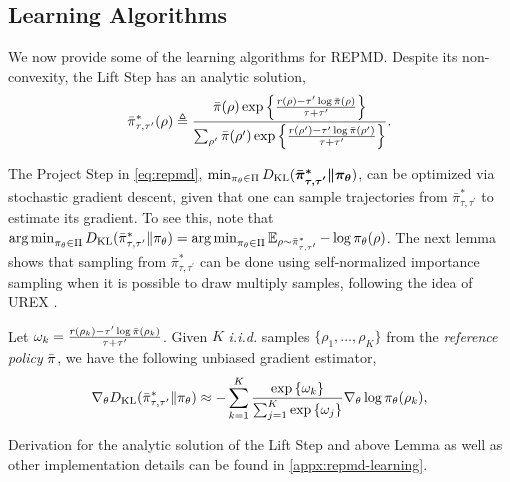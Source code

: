 \subsection{Learning Algorithms}

We now provide some of the learning algorithms for REPMD.
Despite its non-convexity, the Lift Step
has an analytic solution,
\begin{equation}
	\label{eq:pitautauprime}
	\bar{\pi}_{\tau,\tau^{\prime}}^*(\rho) \triangleq \frac{\bar{\pi}(\rho) \exp\left\{ \frac{r(\rho)-\tau^{\prime} \log \bar{\pi}(\rho) }{ \tau+\tau^{\prime}} \right\}}{ \sum_{\rho^{\prime}}{\bar{\pi}(\rho^{\prime}) \exp\left\{ \frac{r(\rho^{\prime})-\tau^{\prime} \log \bar{\pi}(\rho^{\prime})}{ \tau+\tau^{\prime}} \right\} } }.
\end{equation}
	
The Project Step in \cref{eq:repmd}, $\min\nolimits_{\pi_\theta \in \Pi}{D_{\mathrm{KL}}(\bm{ \bar{\pi}_{\tau,\tau^{\prime}}^* \| \pi_\theta }) }$, can be optimized via stochastic gradient descent, given that one can sample trajectories from $\bar{\pi}_{\tau,\tau^{\prime}}^*$ to estimate its gradient. To see this, note that $\operatorname*{arg\,min}\nolimits_{\pi_\theta \in \Pi}D_{\mathrm{KL}}(\bar{\pi}_{\tau,\tau^{\prime}}^* \| \pi_\theta) = \operatorname*{arg\,min}\nolimits_{\pi_\theta \in \Pi} \operatorname*{\mathbb{E}}_{\rho \sim \bar{\pi}_{\tau,\tau^{\prime}}^* }  - \log \pi_\theta(\rho)$. The next lemma shows that sampling from $\bar{\pi}_{\tau,\tau^{\prime}}^*$ can be done using self-normalized importance sampling \citep{owen2013monte} when it is possible to draw multiply samples, following the idea of UREX \citep{nachum2017improving}.   
\begin{lem}
\label{lem:repmdgradientestimate}
Let $\omega_k = \frac{r(\rho_k) - \tau^{\prime} \log{\bar{\pi}(\rho_k)} }{\tau + \tau^{\prime}}$. Given $K$ \emph{i.i.d.} samples $\{\rho_1, \dots, \rho_K\}$ from the \emph{reference policy} $\bar{\pi}$, we have the following unbiased gradient estimator,
\begin{equation}
\label{eq:gradient_estimator}
	\nabla_{\theta} D_{\mathrm{KL}}(\bar{\pi}_{\tau,\tau^{\prime}}^* \| \pi_\theta)\approx -\sum\limits_{k=1}^K{ \frac{ \exp\left\{ \omega_k \right\} }{ \sum_{j=1}^K{ \exp\left\{ \omega_j \right\}}} \nabla_{\theta} \log{\pi_\theta(\rho_k)} },
\end{equation}
\end{lem}
Derivation for the analytic solution of the Lift Step and above Lemma as well as other implementation details can be found in \cref{appx:repmd-learning}.

